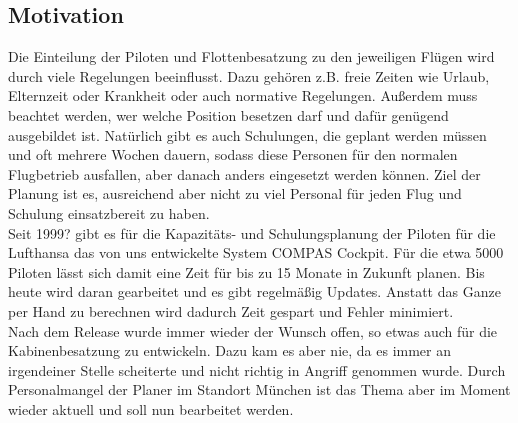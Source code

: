 \documentclass [12pt, a4paper, oneside, titlepage, ngerman]{article}
\begin{document}
\subsection {Motivation}
Die Einteilung der Piloten und Flottenbesatzung zu den jeweiligen Flügen wird durch viele Regelungen beeinflusst. Dazu gehören z.B. freie Zeiten wie Urlaub, Elternzeit oder Krankheit oder auch normative Regelungen. Außerdem muss beachtet werden, wer welche Position besetzen darf und dafür genügend ausgebildet ist. Natürlich gibt es auch Schulungen, die geplant werden müssen und oft mehrere Wochen dauern, sodass diese Personen für den normalen Flugbetrieb ausfallen, aber danach anders eingesetzt werden können. Ziel der Planung ist es, ausreichend aber nicht zu viel Personal für jeden Flug und Schulung einsatzbereit zu haben. \\
Seit 1999? gibt es für die Kapazitäts- und Schulungsplanung der Piloten für die Lufthansa das von uns entwickelte System COMPAS Cockpit. Für die etwa 5000 Piloten lässt sich damit eine Zeit für bis zu 15 Monate in Zukunft planen. Bis heute wird daran gearbeitet und es gibt regelmäßig Updates. Anstatt das Ganze per Hand zu berechnen wird dadurch Zeit gespart und Fehler minimiert. \\
Nach dem Release wurde immer wieder der Wunsch offen, so etwas auch für die Kabinenbesatzung zu entwickeln. Dazu kam es aber nie, da es immer an irgendeiner Stelle scheiterte und nicht richtig in Angriff genommen wurde. Durch Personalmangel der Planer im Standort München ist das Thema aber im Moment wieder aktuell und soll nun bearbeitet werden.
\end{document}
